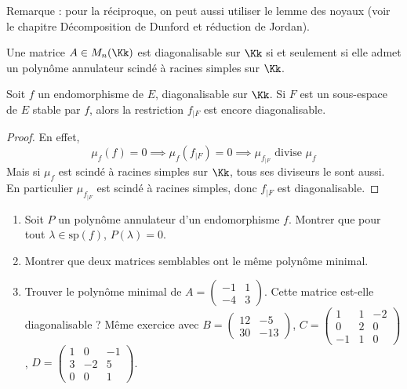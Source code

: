 \documentclass[12pt, class=report,crop=false]{standalone}
\newcommand{\Sp}{\text{sp}}
\begin{document}
Remarque : pour la réciproque, on peut aussi utiliser le lemme des noyaux (voir le chapitre \og{}Décomposition de Dunford et réduction de Jordan\fg{}). 

\medskip

\begin{corollaire}
Une matrice $A \in M_n(\Kk)$ est diagonalisable sur $\Kk$ si et seulement si elle admet un polynôme annulateur scindé à racines simples sur $\Kk$.
\end{corollaire}

\begin{corollaire}
Soit $f$ un endomorphisme de $E$, diagonalisable sur $\Kk$. Si $F$ est un sous-espace de $E$ stable par $f$, alors la restriction $f_{|F}$ est encore diagonalisable.
\end{corollaire}

\begin{proof}
En effet, 
\[\mu_f(f) = 0 \implies \mu_f(f_{|F}) = 0 \implies \mu_{f_{|F}} \text{ divise } \mu_f\]
Mais si $\mu_f$ est scindé à racines simples sur $\Kk$, 
tous ses diviseurs le sont aussi. En particulier $\mu_{f_{|F}}$ est scindé à racines simples, donc $f_{|F}$ est diagonalisable.
\end{proof}






\begin{miniexercices}
\sauteligne
\begin{enumerate}

  \item Soit $P$ un polynôme annulateur d'un endomorphisme $f$. Montrer que pour tout 
  $\lambda \in \Sp(f)$, $P(\lambda) = 0$.
  
  \item Montrer que deux matrices semblables ont le même polynôme minimal.
 
  \item Trouver le polynôme minimal de 
  $A = \left(\begin{smallmatrix}
  -1 & 1 \\
  -4 & 3  
  \end{smallmatrix}\right)$. 
  Cette matrice est-elle diagonalisable ?
  Même exercice avec 
  $B = \left(\begin{smallmatrix} 
  12 & -5 \\
  30 & -13
  \end{smallmatrix}\right)$, 
  $C = \left(\begin{smallmatrix}  
  1 & 1 & -2 \\
  0 & 2 & 0 \\
  -1 & 1 & 0
  \end{smallmatrix}\right)$,
  $D = \left(\begin{smallmatrix} 
  1 & 0 & -1 \\
  3 & -2 & 5 \\
  0 & 0 & 1 
  \end{smallmatrix}\right)$.   
    
\end{enumerate}
\end{miniexercices}






\finchapitre 
\end{document}
